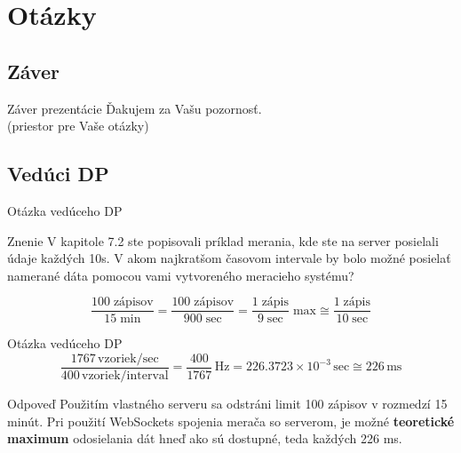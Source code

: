 \documentclass[hyperref={unicode}]{beamer}
\begin{document}
\section{Otázky}
\label{sec:Otázky}

\subsection{Záver}
\label{sub:Záver}

\begin{frame}{Záver prezentácie}
	\centering
	{\Large Ďakujem za Vašu pozornosť.\\
	\vspace{1cm}
	(priestor pre Vaše otázky)}
\end{frame}



\subsection{Vedúci DP}
\label{sub:Vedúci}

\begin{frame}{Otázka vedúceho DP}
	\begin{block}{Znenie}
		V kapitole 7.2 ste popisovali príklad merania, kde ste na server posielali údaje každých 10s. V akom najkratšom časovom intervale by bolo možné posielať namerané dáta pomocou vami vytvoreného meracieho systému?
	\end{block}

	\begin{equation*}
		\frac{100\;\text{zápisov}}{15\;\text{min}} = \frac{100\;\text{zápisov}}{900\;\text{sec}} = \frac{1\;\text{zápis}}{9\;\text{sec}}\;\text{max} \cong \frac{1\;\text{zápis}}{10\;\text{sec}}
	\end{equation*}
\end{frame}



\begin{frame}{Otázka vedúceho DP}
	\begin{equation*}
		\frac{1767\,\text{vzoriek/sec}}{400\,\text{vzoriek/interval}} = \frac{400}{1767}\,\text{Hz} = 226.3723\times 10^{-3}\,\text{sec}\cong 226\,\text{ms}
	\end{equation*}

	\begin{block}{Odpoveď}
		Použitím vlastného serveru sa odstráni limit 100 zápisov v rozmedzí 15 minút. Pri použití WebSockets spojenia merača so serverom, je možné \textbf{teoretické maximum} odosielania dát hneď ako sú dostupné, teda každých 226 ms.
	\end{block}
\end{frame}
\end{document}
